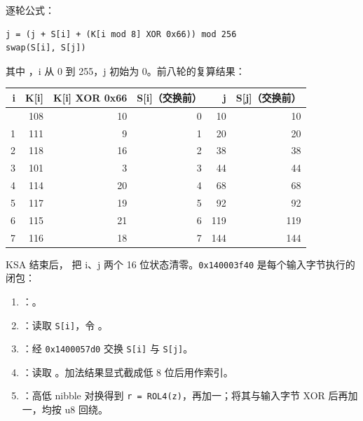 逐轮公式：

\begin{verbatim}
j = (j + S[i] + (K[i mod 8] XOR 0x66)) mod 256
swap(S[i], S[j])
\end{verbatim}

其中 \texttt{}，i 从 0 到 255，j 初始为 0。前八轮的复算结果：

{\def\LTcaptype{} %
\begin{longtable}[]{@{}rrrrrr@{}}
\toprule\noalign{}
i & K{[}i{]} & K{[}i{]} XOR 0x66 & S{[}i{]}（交换前） & j & S{[}j{]}（交换前） \\
\midrule\noalign{}
\endhead
\bottomrule\noalign{}
\endlastfoot
0 & 108 & 10 & 0 & 10 & 10 \\
1 & 111 & 9 & 1 & 20 & 20 \\
2 & 118 & 16 & 2 & 38 & 38 \\
3 & 101 & 3 & 3 & 44 & 44 \\
4 & 114 & 20 & 4 & 68 & 68 \\
5 & 117 & 19 & 5 & 92 & 92 \\
6 & 115 & 21 & 6 & 119 & 119 \\
7 & 116 & 18 & 7 & 144 & 144 \\
\end{longtable}
}

KSA 结束后，\texttt{} 把 i、j 两个 16 位状态清零。\texttt{0x140003f40} 是每个输入字节执行的闭包：

\begin{enumerate}
\def\labelenumi{\arabic{enumi}.}
\tightlist
\item
  \texttt{}：\texttt{}。
\item
  \texttt{}：读取 \texttt{S{[}i{]}}，令 \texttt{}。
\item
  \texttt{}：经 \texttt{0x1400057d0} 交换 \texttt{S{[}i{]}} 与 \texttt{S{[}j{]}}。
\item
  \texttt{}：读取 \texttt{}。加法结果显式截成低 8 位后用作索引。
\item
  \texttt{}：高低 nibble 对换得到 \texttt{r\ =\ ROL4(z)}，再加一；将其与输入字节 XOR 后再加一，均按 u8 回绕。
\end{enumerate}

